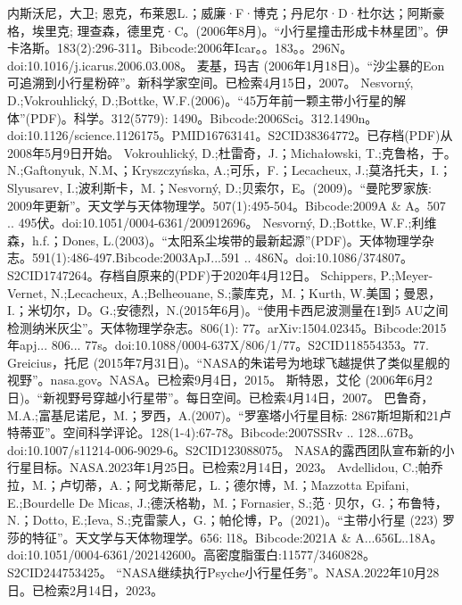 \begin{enumerate}
 内斯沃尼，大卫; 恩克，布莱恩L.；威廉·F·博克；丹尼尔·D·杜尔达；阿斯豪格，埃里克; 理查森，德里克·C。(2006年8月)。“小行星撞击形成卡林星团”。伊卡洛斯。183(2):296-311。Bibcode:2006年Icar。。183。。296N。doi:10.1016/j.icarus.2006.03.008。
 麦基，玛吉 (2006年1月18日)。“沙尘暴的Eon可追溯到小行星粉碎”。新科学家空间。已检索4月15日，2007。
 Nesvorný, D.;Vokrouhlický, D.;Bottke, W.F.(2006)。“45万年前一颗主带小行星的解体”(PDF)。科学。312(5779): 1490。Bibcode:2006Sci。312.1490n。doi:10.1126/science.1126175。PMID16763141。S2CID38364772。已存档(PDF)从2008年5月9日开始。   
 Vokrouhlický, D.;杜雷奇，J.；Michałowski, T.;克鲁格，于。N.;Gaftonyuk, N.M、；Kryszczyńska, A.;可乐，F.；Lecacheux, J.;莫洛托夫，I.；Slyusarev, I.;波利斯卡，M.；Nesvorný, D.;贝索尔，E。(2009)。“曼陀罗家族: 2009年更新”。天文学与天体物理学。507(1):495-504。Bibcode:2009A & A。507 .. 495伏。doi:10.1051/0004-6361/200912696。
 Nesvorný, D.;Bottke, W.F.;利维森，h.f.；Dones, L.(2003)。“太阳系尘埃带的最新起源”(PDF)。天体物理学杂志。591(1):486-497.Bibcode:2003ApJ...591 .. 486N。doi:10.1086/374807。S2CID1747264。存档自原来的(PDF)于2020年4月12日。  
 Schippers, P.;Meyer-Vernet, N.;Lecacheux, A.;Belheouane, S.;蒙库克，M.；Kurth, W.美国；曼恩，I.；米切尔，D。G.;安德烈，N.(2015年6月)。“使用卡西尼波测量在1到5 AU之间检测纳米灰尘”。天体物理学杂志。806(1): 77。arXiv:1504.02345。Bibcode:2015年apj... 806... 77s。doi:10.1088/0004-637X/806/1/77。S2CID118554353。77. 
 Greicius，托尼 (2015年7月31日)。“NASA的朱诺号为地球飞越提供了类似星舰的视野”。nasa.gov。NASA。已检索9月4日，2015。
 斯特恩，艾伦 (2006年6月2日)。“新视野号穿越小行星带”。每日空间。已检索4月14日，2007。
 巴鲁奇，M.A.;富基尼诺尼，M.；罗西，A.(2007)。“罗塞塔小行星目标: 2867斯坦斯和21卢特蒂亚”。空间科学评论。128(1-4):67-78。Bibcode:2007SSRv .. 128...67B。doi:10.1007/s11214-006-9029-6。S2CID123088075。 
 NASA的露西团队宣布新的小行星目标。NASA.2023年1月25日。已检索2月14日，2023。
 Avdellidou, C.;帕乔拉，M.；卢切蒂，A.；阿戈斯蒂尼，L.；德尔博，M.；Mazzotta Epifani, E.;Bourdelle De Micas, J.;德沃格勒，M.；Fornasier, S.;范·贝尔，G.；布鲁特，N.；Dotto, E.;Ieva, S.;克雷蒙人，G.；帕伦博，P。(2021)。“主带小行星 (223) 罗莎的特征”。天文学与天体物理学。656: l18。Bibcode:2021A & A...656L..18A。doi:10.1051/0004-6361/202142600。高密度脂蛋白:11577/3460828。S2CID244753425。 
 “NASA继续执行Psyche小行星任务”。NASA.2022年10月28日。已检索2月14日，2023。
 \end{enumerate}
